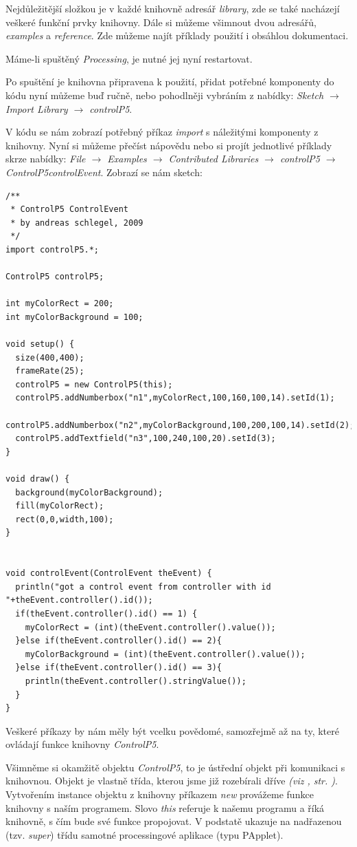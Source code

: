 \documentclass[10pt,twoside=true,open=right,cleardoublepage=empty,chapterprefix=true]{scrbook}
\newcommand{\vyraz}[1]{\textit{\gls{#1}}\index{#1}\label{#1}}
\newcommand{\odkaz}[1]{\textit{(viz \nameref{#1}, str. \pageref*{#1})}}
\begin{document}
\newpage

Nejdůležitější složkou je v každé knihovně adresář {\em library}, zde se také nacházejí veškeré funkční prvky knihovny. Dále si můžeme všimnout dvou adresářů, {\em examples} a {\em reference}. Zde můžeme najít příklady použití i obsáhlou dokumentaci.

Máme-li spuštěný {\em Processing}, je nutné jej nyní restartovat.

Po spuštění je knihovna připravena k použití, přidat potřebné komponenty do kódu nyní můžeme buď ručně, nebo pohodlněji vybráním z nabídky: {\em Sketch $\rightarrow$ Import Library $\rightarrow$ controlP5}.

V kódu se nám zobrazí potřebný příkaz \vyraz{import} s náležitými komponenty z knihovny. Nyní si můžeme přečíst nápovědu nebo si projít jednotlivé příklady skrze nabídky: {\em File $\rightarrow$ Examples $\rightarrow$ Contributed Libraries $\rightarrow$ controlP5 $\rightarrow$ ControlP5controlEvent}.
Zobrazí se nám sketch:

 
\begin{lstlisting}
/**
 * ControlP5 ControlEvent
 * by andreas schlegel, 2009
 */
import controlP5.*;

ControlP5 controlP5;

int myColorRect = 200;
int myColorBackground = 100;

void setup() {
  size(400,400);
  frameRate(25);
  controlP5 = new ControlP5(this);
  controlP5.addNumberbox("n1",myColorRect,100,160,100,14).setId(1);
  controlP5.addNumberbox("n2",myColorBackground,100,200,100,14).setId(2);
  controlP5.addTextfield("n3",100,240,100,20).setId(3);
}

void draw() {
  background(myColorBackground);
  fill(myColorRect);
  rect(0,0,width,100);
}


void controlEvent(ControlEvent theEvent) {
  println("got a control event from controller with id "+theEvent.controller().id());
  if(theEvent.controller().id() == 1) {
    myColorRect = (int)(theEvent.controller().value());
  }else if(theEvent.controller().id() == 2){
    myColorBackground = (int)(theEvent.controller().value());
  }else if(theEvent.controller().id() == 3){
    println(theEvent.controller().stringValue());
  }
}
\end{lstlisting}

Veškeré příkazy by nám měly být vcelku povědomé, samozřejmě až na ty, které ovládají funkce knihovny {\em ControlP5}.

Všimněme si okamžitě objektu {\em ControlP5}, to je ústřední objekt při komunikaci s knihovnou. Objekt je vlastně třída, kterou jsme již rozebírali dříve \odkaz{Třída a objekt}. Vytvořením instance objektu z knihovny příkazem \vyraz{new} provážeme funkce knihovny s naším programem. Slovo \vyraz{this} referuje k našemu programu a říká knihovně, s čím bude své funkce propojovat. V podstatě ukazuje na nadřazenou (tzv. {\em super}) třídu samotné processingové aplikace (typu PApplet).
\end{document}
